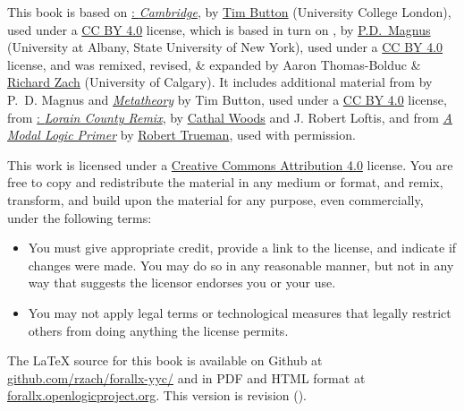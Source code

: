\newpage
\noindent\small%
\fi
This book is based on
\href{https://www.homepages.ucl.ac.uk/~uctytbu/OERs.html}{\forallx:
\textit{Cambridge}}, by 
\href{https://www.homepages.ucl.ac.uk/~uctytbu/}{Tim Button} (University College London), 
used under a \href{https://creativecommons.org/licenses/by/4.0/}{CC BY
4.0} license, which is based in turn
on \href{https://www.fecundity.com/logic/}{\forallx}, by
\href{https://www.fecundity.com/job/}{P.D.\ Magnus} 
(University at Albany, State University of New York),
used under a \href{https://creativecommons.org/licenses/by/4.0/}{CC BY
4.0} license, 
and was remixed, revised, \& expanded by Aaron
Thomas-Bolduc \& \href{https://richardzach.org/}{Richard Zach}
(University of Calgary).
It includes additional material from \forallx{} by P.~D. Magnus and
\href{https://www.homepages.ucl.ac.uk/~uctytbu/OERs.html}{\textit{Metatheory}} by Tim Button, 
used under a \href{https://creativecommons.org/licenses/by/4.0/}{CC BY
4.0} license, 
from \href{https://github.com/rob-helpy-chalk/openintroduction}{\forallx: \textit{Lorain
County Remix}},
by \href{https://sites.google.com/site/cathalwoods/}{Cathal Woods} and
J. Robert Loftis, and from \href{http://www.rtrueman.com/uploads/7/0/3/2/70324387/modal_logic_primer.pdf}{\textit{A Modal Logic Primer}} by \href{http://www.rtrueman.com/}{Robert Trueman}, used with permission.


\ifHTMLtarget\else
  \bigskip

  \noindent\footnotesize
\fi
This work is licensed under a \href{https://creativecommons.org/licenses/by/4.0/}{Creative Commons Attribution 4.0} license.
You are free to copy and redistribute the material in any medium or format, and  remix, transform, and build upon the material for any purpose, even commercially, under the following terms:
\begin{itemize}
\item You must give appropriate credit, provide a link to the license, and indicate if changes were made. You may do so in any reasonable manner, but not in any way that suggests the licensor endorses you or your use.
\item You may not apply legal terms or technological measures that legally restrict others from doing anything the license permits.
\end{itemize}

\ifHTMLtarget\else
\vfil\normalsize\noindent
\fi
The \LaTeX{} source for this book is available on Github at
\href{https://github.com/rzach/forallx-yyc/}{github.com/rzach/forallx-yyc/} and in PDF and
HTML format at
\href{https://forallx.openlogicproject.org}{forallx.openlogicproject.org}.
This version is revision \gitAbbrevHash{}
(\gitCommitterDate).

